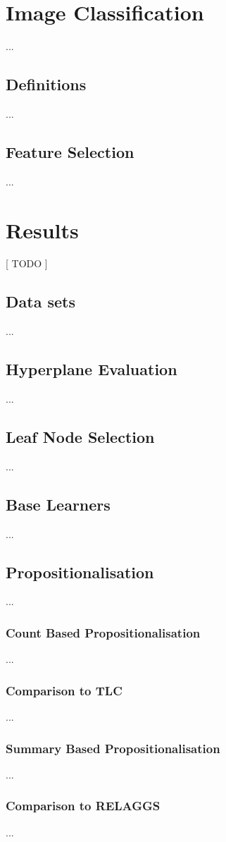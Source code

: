 \documentclass[a4paper,12pt]{report} %
\begin{document}
\chapter{Image Classification}
...
\section{Definitions}
...
\section{Feature Selection}
...

\chapter{Results}
\label{ch:Results}


[ TODO ]
\section{Data sets}
...
\section{Hyperplane Evaluation}
...
\section{Leaf Node Selection}
...
\section{Base Learners}
...
\section{Propositionalisation}
...
\subsection{Count Based Propositionalisation}
...
\subsection{Comparison to TLC}
...
\subsection{Summary Based Propositionalisation}
...
\subsection{Comparison to RELAGGS}
...
\end{document}
